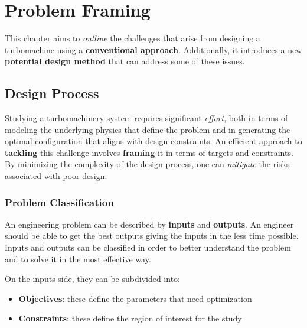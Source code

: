 \chapter{Problem Framing}

This chapter aims to \textit{outline} the challenges that arise from designing a turbomachine using a \textbf{conventional approach}. 
Additionally, it introduces a new \textbf{potential design method} that can address some of these issues.

\section{Design Process}


Studying a turbomachinery system requires significant \textit{effort}, both in terms of modeling the underlying physics that define the problem 
and in generating the optimal configuration that aligns with design constraints. An efficient approach to \textbf{tackling} this challenge involves 
\textbf{framing} it in terms of targets and constraints. By minimizing the complexity of the design process, one can \textit{mitigate} the risks associated with poor design.

\subsection{Problem Classification}

An engineering problem can be described by \textbf{inputs} and \textbf{outputs}. 
An engineer should be able to get the best outputs giving the inputs in the less time possible. 
Inputs and outputs can be classified in order to better understand the problem and to solve it in the most effective way.

On the inputs side, they can be subdivided into: 
\begin{itemize}
    \item \textbf{Objectives}: these define the parameters that need optimization 
    \item \textbf{Constraints}: these define the region of interest for the study
\end{itemize}

